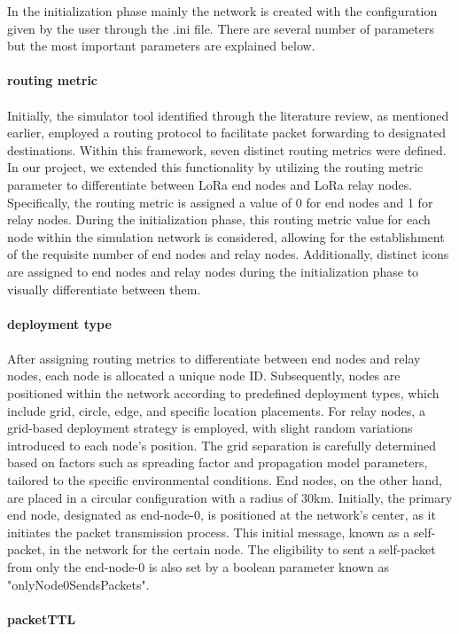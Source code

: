 In the initialization phase mainly the network is created with the configuration given by the user through the .ini file. There are several number of parameters but the most important parameters are explained below.\\\\
\textbf{routing metric}\\\\
Initially, the simulator tool identified through the literature review, as mentioned earlier, employed a routing protocol to facilitate packet forwarding to designated destinations. Within this framework, seven distinct routing metrics were defined. In our project, we extended this functionality by utilizing the routing metric parameter to differentiate between LoRa end nodes and LoRa relay nodes. Specifically, the routing metric is assigned a value of 0 for end nodes and 1 for relay nodes. During the initialization phase, this routing metric value for each node within the simulation network is considered, allowing for the establishment of the requisite number of end nodes and relay nodes. Additionally, distinct icons are assigned to end nodes and relay nodes during the initialization phase to visually differentiate between them.\\\\
\textbf{deployment type}\\\\
After assigning routing metrics to differentiate between end nodes and relay nodes, each node is allocated a unique node ID. Subsequently, nodes are positioned within the network according to predefined deployment types, which include grid, circle, edge, and specific location placements. For relay nodes, a grid-based deployment strategy is employed, with slight random variations introduced to each node's position. The grid separation is carefully determined based on factors such as spreading factor and propagation model parameters, tailored to the specific environmental conditions. End nodes, on the other hand, are placed in a circular configuration with a radius of 30km. Initially, the primary end node, designated as end-node-0, is positioned at the network's center, as it initiates the packet transmission process. This initial message, known as a self-packet, in the network for the certain node. The eligibility to sent a self-packet from only the end-node-0 is also set by a boolean parameter known as "onlyNode0SendsPackets".\\\\
\textbf{packetTTL}\\\\
